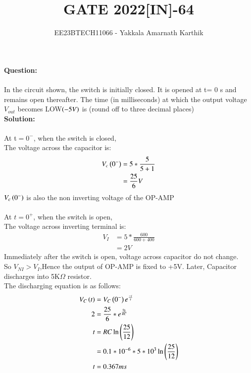 \documentclass[journal,12pt,twocolumn]{IEEEtran}
\begin{document}


\title{GATE 2022[IN]-64}
\author{EE23BTECH11066 - Yakkala Amarnath Karthik}
\maketitle


\textbf{Question:}\\ \\
In the circuit shown, the switch is initially closed. It is opened at t= 0 s and
remains open thereafter. The time (in milliseconds) at which the output voltage
$V_{out}$ becomes LOW$\left(-5V\right)$ is  (round off to three decimal places)\\


\textbf{Solution:}\\ \\
At t$=0^-$, when the switch is closed,\\
The voltage across the capacitor is:
\begin{align}
V_c\left(0^-\right)&=5*\frac{5}{5+1}\\
&=\frac{25}{6}V
\end{align}
$V_c\left(0^-\right)$ is also the non inverting voltage of the OP-AMP\\ \\
At $t=0^+$, when the switch is open,\\
The voltage across inverting terminal is:
\begin{align}
V_I&=5*\frac{600}{600+400}\\
&=2V
\end{align}
Immediately after the switch is open, voltage across capacitor do not change.\\ So $V_{NI}>V_I$,Hence the output of OP-AMP is fixed to +5V.
Later, Capacitor discharges into 5K$\Omega$ resistor.\\
The discharging equation is as follows:
\begin{align}
    V_C\left(t\right)&=V_C\left(0^-\right)e^{\frac{-t}{\tau}}\\ 
    2&=\frac{25}{6}*e^{\frac{t_0}{RC}}\\
    t&=RC\ln\left(\frac{25}{12}\right)\\
    &=0.1*10^{-6}*5*10^{3}\ln{\ensuremath{\left(\frac{25}{12}\right)}}\\
    t&=0.367ms
\end{align}


\end{document}
